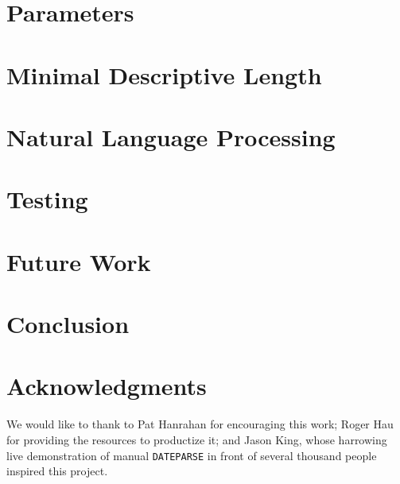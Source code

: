 \documentclass{acm_proc_article-sp}
\def\dateparse{\texttt{DATEPARSE} }
\begin{document}
\section{Parameters}


\section{Minimal Descriptive Length}


\section{Natural Language Processing}


\section{Testing}


\section{Future Work}


\section{Conclusion}


\section{Acknowledgments}
We would like to thank to Pat Hanrahan for encouraging this work; Roger Hau for providing the resources to productize it; and Jason King, whose harrowing live demonstration of manual \dateparse in front of several thousand people inspired this project.

%

%
%

\balancecolumns
\end{document}
